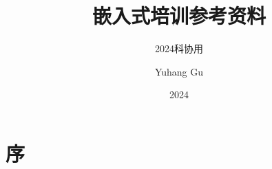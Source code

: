 \documentclass[cn,newtx,15pt]{elegantbook}
\title{嵌入式培训参考资料}
\subtitle{2024科协用}
\author{Yuhang Gu}
\date{2024}
\institute{Southeast University, School of Electronics Engineering}
\begin{document}
\maketitle

\frontmatter
\tableofcontents
\newpage

\chapter{序}



\mainmatter



\end{document}
